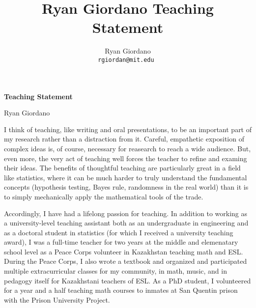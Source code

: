 

\usepackage{enumitem}

\usepackage{geometry}
\geometry{top=0.9in}
\geometry{left=1.4in}
\geometry{right=1.4in}


\title{Ryan Giordano Teaching Statement}

\author{
  Ryan Giordano \\ \texttt{rgiordan@mit.edu }
}




\begin{minipage}[t]{0.5\textwidth}
\hspace{-2em} %
{\bf \LARGE Teaching Statement}\\
\end{minipage}
\begin{minipage}[t]{0.5\textwidth}
        \hspace{8em} %
        {\LARGE Ryan Giordano}
\end{minipage}


I think of teaching, like writing and oral presentations, to be an important
part of my research rather than a distraction from it.  Careful, empathetic
exposition of complex ideas is, of course, necessary for reasearch to reach a
wide audience.  But, even more, the very act of teaching well forces the teacher
to refine and examing their ideas.  The benefits of thoughtful teaching are
particularly great in a field like statistics, where it can be much harder to
truly understand the fundamental concepts (hypothesis testing, Bayes rule,
randomness in the real world) than it is to simply mechanically apply the
mathematical tools of the trade.

Accordingly, I have had a lifelong passion for teaching.  In addition to working
as a university-level teaching assistant both as an undergraduate in engineering
and as a doctoral student in statistics (for which I received a university
teaching award), I was a full-time teacher for two years at the middle and
elemenatary school level as a Peace Corps volunteer in Kazakhstan teaching math
and ESL.  During the Peace Corps, I also wrote a textbook and organized and
participated multiple extracurricular classes for my community, in math, music,
and in pedagogy itself for Kazakhstani teachers of ESL.  As a PhD student, I
volunteered for a year and a half teaching math courses to inmates at San
Quentin prison with the Prison University Project.

